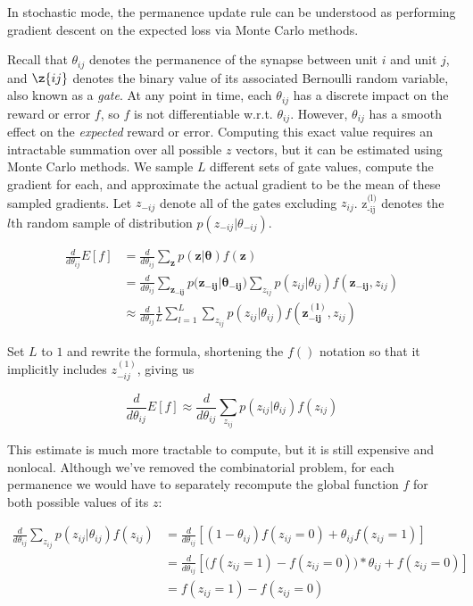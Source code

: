 \documentclass[11pt]{article}
\begin{document}
In stochastic mode, the permanence update rule can be understood as performing gradient descent on the expected loss via Monte Carlo methods.

Recall that \(\theta_{ij}\) denotes the permanence of the synapse between unit \(i\) and unit \(j\), and \(\z{ij}\) denotes the binary value of its associated Bernoulli random variable, also known as a \emph{gate}.  At any point in time, each \(\theta_{ij}\) has a discrete impact on the reward or error \(f\), so \(f\) is not differentiable w.r.t. \(\theta_{ij}\). However, \(\theta_{ij}\) has a smooth effect on the \emph{expected} reward or error. Computing this exact value requires an intractable summation over all possible \(z\) vectors, but it can be estimated using Monte Carlo methods. We sample \(L\) different sets of gate values, compute the gradient for each, and approximate the actual gradient to be the mean of these sampled gradients. Let \(z_{-ij}\) denote all of the gates excluding \(z_{ij}\). z\(_{\text{-ij}}^{\text{(l)}}\) denotes the \(l\text{th}\) random sample of distribution \(p(z_{-ij} |\theta_{-ij})\).

\begin{align*}
\frac{d}{d\theta_{ij}}E[f] &=
\frac{d}{d\theta_{ij}}\sum_{\bm{z}}{p(\bm{z} | \bm{\theta}) f(\bm{z})} \\
&=
\frac{d}{d\theta_{ij}}\sum_{\bm{z_{-ij}}}{p(\bm{z_{-ij}} | \bm{\theta_{-ij})} \sum_{z_{ij}}{p(z_{ij} | \theta_{ij}) f(\bm{z_{-ij}}, z_{ij})}} \\
&\approx
\frac{d}{d\theta_{ij}}\frac{1}{L}\sum_{l=1}^L{\sum_{z_{ij}}{p(z_{ij} | \theta_{ij}) f(\bm{z_{-ij}^{(l)}}, z_{ij})}}
\end{align*}

Set \(L\) to \(1\) and rewrite the formula, shortening the \(f()\) notation so that it implicitly includes \(z_{-ij}^{(1)}\), giving us

$$
\frac{d}{d\theta_{ij}}E[f] \approx \frac{d}{d\theta_{ij}}\sum_{z_{ij}}{p(z_{ij} | \theta_{ij})f(z_{ij})}
$$

This estimate is much more tractable to compute, but it is still expensive and nonlocal. Although we've removed the combinatorial problem, for each permanence we would have to separately recompute the global function \(f\) for both possible values of its \(z\):

\begin{align*}
\frac{d}{d\theta_{ij}}\sum_{z_{ij}}{p(z_{ij} | \theta_{ij})f(z_{ij})} &=
 \frac{d}{d\theta_{ij}}\left[
(1 - \theta_{ij})f(z_{ij}=0) +
\theta_{ij}f(z_{ij}=1)
\right]
\\
&= \frac{d}{d\theta_{ij}}\left[
\Big(f(z_{ij}=1) - f(z_{ij}=0)\Big)*\theta_{ij} + f(z_{ij}=0)
\right]
\\
&= f(z_{ij}=1) - f(z_{ij}=0)
\end{align*}
\end{document}
